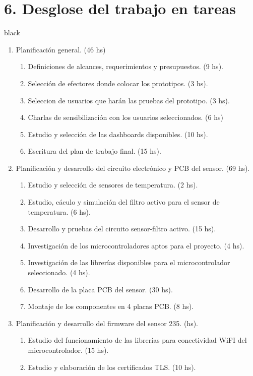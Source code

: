 \documentclass[11pt]{charter}
\begin{document}
\section{6. Desglose del trabajo en tareas}
\label{sec:wbs}

\begin{consigna}{black}
\begin{enumerate}
\item Planificación general. (46 hs)
	\begin{enumerate}
	\item Definiciones de alcances, requerimientos y presupuestos. (9 hs).
	\item Selección de efectores donde colocar los prototipos. (3 hs).
	\item Seleccion de usuarios que harán las pruebas del prototipo. (3 hs).
	\item Charlas de sensibilización con los usuarios seleccionados. (6 hs)
	\item Estudio y selección de las dashboards disponibles. (10 hs).
	\item Escritura del plan de trabajo final. (15 hs).
	\end{enumerate}
\item Planificación y desarrollo del circuito electrónico y PCB del sensor. (69 hs).
	\begin{enumerate}
	\item Estudio y selección de sensores de temperatura. (2 hs).
	\item Estudio, cáculo y simulación del filtro activo para el sensor de temperatura. (6 hs).
	\item Desarrollo y pruebas del circuito sensor-filtro activo. (15 hs).
    \item Investigación de los microcontroladores aptos para el proyecto. (4 hs).	
	\item Investigación de las librerías disponibles para el microcontrolador seleccionado. (4 hs).
	\item Desarrollo de la placa PCB del sensor. (30 hs).
	\item Montaje de los componentes en 4 placas PCB. (8 hs).
	\end{enumerate}
\item Planificación y desarrollo del firmware del sensor 235.  (hs).
	\begin{enumerate}
	\item Estudio del funcionamiento de las librerías para conectividad WiFI del microcontrolador. (15 hs).
	\item Estudio y elaboración de los certificados TLS.  (10 hs).

\end{enumerate}
\end{enumerate}
\end{consigna}
\end{document}
